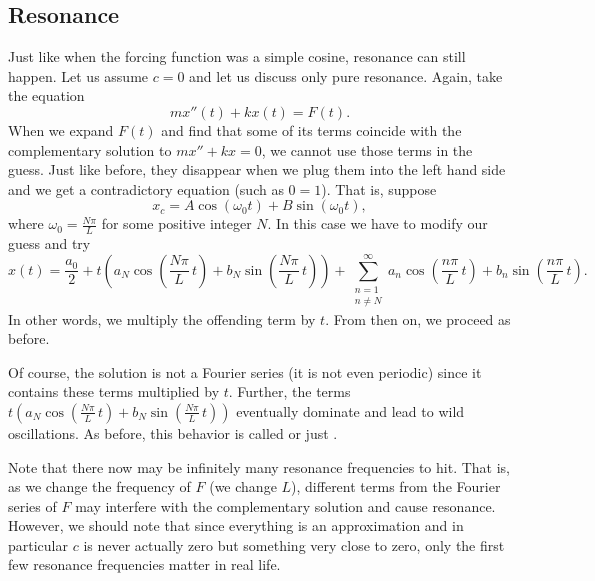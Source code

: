 \documentclass[12pt]{book}
\begin{document}
\subsection{Resonance}

Just like when the forcing function was a simple cosine, resonance can still
happen.  Let us assume $c=0$ and let us discuss only pure resonance.
Again, take the equation
\begin{equation*}
m x''(t) + k x (t) = F(t) .
\end{equation*}
When we expand $F(t)$ and find that some of its terms coincide with the
complementary solution to $mx''+kx=0$, we cannot use those terms in the
guess.  Just like before, they disappear when we plug them into the left hand
side and we get a contradictory equation (such as $0=1$).   That is,
suppose
\begin{equation*}
x_c = A \cos (\omega_0 t) + B \sin (\omega_0 t), 
\end{equation*}
where $\omega_0 = \frac{N \pi}{L}$ for some positive integer $N$.
In this case we have
to modify our guess and try
\begin{equation*}
x(t) = \frac{a_0}{2} +
t \left(
a_N \cos \left( \frac{N \pi}{L}\, t \right) +
b_N \sin \left( \frac{N \pi}{L}\, t \right) \right) +
\sum_{\substack{n=1\\n\not= N}}^\infty
a_n \cos \left( \frac{n \pi}{L}\, t \right) +
b_n \sin \left( \frac{n \pi}{L} \, t \right) .
\end{equation*}
In other words, we multiply the offending term by $t$.  From then on, we
proceed as before.

Of course, the solution is not a Fourier series (it is not even
periodic) since it contains these terms multiplied by $t$.  Further, the
terms
$t \left( a_N \cos \left( \frac{N \pi}{L}\, t \right) +
b_N \sin \left( \frac{N \pi}{L}\, t \right) \right)$ eventually dominate and lead to
wild oscillations.  As before, this behavior is called \emph{} or just \emph{}.

Note that there now may be infinitely many resonance frequencies to hit.
That is, as we change the frequency of $F$ (we change $L$), different
terms from the Fourier series of $F$ may interfere with the complementary
solution and cause resonance.
However, we should note that since everything is an approximation and in
particular $c$ is never actually zero but something very close to zero,
only the first
few resonance frequencies matter in real life.
\end{document}
